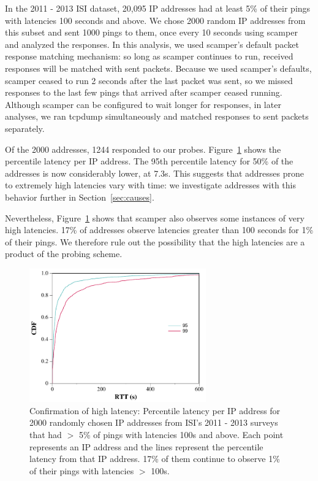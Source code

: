 In the 2011 - 2013
ISI dataset, 20,095 IP
addresses had at least 5\% of their pings with latencies 100 seconds and above. We chose 2000 random IP addresses from
this subset and sent 1000 pings to them, once every 10 seconds using
scamper~\cite{luckie2010scamper} and analyzed the responses. 
In this
analysis, we used scamper's default packet response matching
mechanism: so long as scamper continues to run, received responses
will be matched with sent packets. Because we used scamper's defaults,
scamper ceased to run 2 seconds after the last packet was sent, so
we missed responses to the last few pings that arrived after
scamper ceased running. Although scamper can
be configured to wait longer for responses, in later analyses, we ran tcpdump simultaneously and matched
responses to sent packets separately.

Of the 2000 addresses, 1244 responded to our probes.
Figure~\ref{fig:cdf_high_rtt_ips} shows the percentile latency per IP
address. The 95th percentile latency for 50\% of the addresses is now
considerably lower, at 7.3s. This suggests that addresses prone to extremely high
latencies vary with time: we investigate addresses with
this behavior further in Section~\ref{sec:causes}. 

Nevertheless, Figure~\ref{fig:cdf_high_rtt_ips} shows that scamper
also observes some instances of very high latencies. 17\%
of addresses observe latencies greater than 100 seconds for 1\%
of their pings. We therefore rule out the possibility that the high
latencies are a product of the probing scheme.



\begin{figure}[tb]
\begin{center}
\includegraphics[width=3in]{timeouts/figs/cdf_high_rtt_guys_grand}
\end{center}
\caption[Confirmation of high latency with Scamper]{\label{fig:cdf_high_rtt_ips}%
Confirmation of high latency: Percentile latency per IP address for
2000 randomly chosen IP addresses from ISI's 2011 - 2013 surveys that had $>$ 5\% of pings with
latencies 100s and above. Each point represents an IP address and the
lines represent the percentile latency from that IP address. 17\% of
them continue to observe 1\% of their pings with
latencies $>$ 100s.
}
\end{figure}

